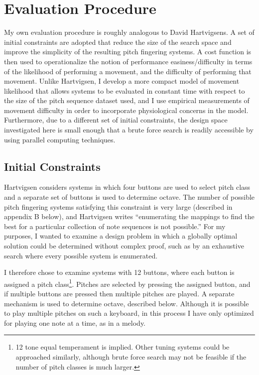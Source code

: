 \documentclass[sigconf]{nimeart}
\begin{document}
\section{Evaluation Procedure}\label{evaluation-procedure}

My own evaluation procedure is roughly analogous to David Hartvigsen\textquotesingle s. A set of initial constraints are adopted that reduce the size of the search space and improve the simplicity of the resulting pitch fingering systems. A cost function is then used to operationalize the notion of performance easiness/difficulty in terms of the likelihood of performing a movement, and the difficulty of performing that movement. Unlike Hartvigsen, I develop a more compact model of movement likelihood that allows systems to be evaluated in constant time with respect to the size of the pitch sequence dataset used, and I use empirical measurements of movement difficulty in order to incorporate physiological concerns in the model. Furthermore, due to a different set of initial constraints, the design space investigated here is small enough that a brute force search is readily accessible by using parallel computing techniques.

\subsection{Initial Constraints}\label{initial-constraints}

Hartvigsen considers systems in which four buttons are used to select pitch class and a separate set of buttons is used to determine octave. The number of possible pitch fingering systems satisfying this constraint is very large (described in appendix B below), and Hartvigsen writes \cite{Hartvigsen2014} ``enumerating the mappings to find the best for a particular collection of note sequences is not possible.'' For my purposes, I wanted to examine a design problem in which a globally optimal solution could be determined without complex proof, such as by an exhaustive search where every possible system is enumerated.

I therefore chose to examine systems with 12 buttons, where each button is assigned a pitch class\footnote{12 tone equal temperament is implied. Other tuning systems could be approached similarly, although brute force search may not be feasible if the number of pitch classes is much larger.}. Pitches are selected by pressing the assigned button, and if multiple buttons are pressed then multiple pitches are played. A separate mechanism is used to determine octave, described below. Although it is possible to play multiple pitches on such a keyboard, in this process I have only optimized for playing one note at a time, as in a melody.
\end{document}
